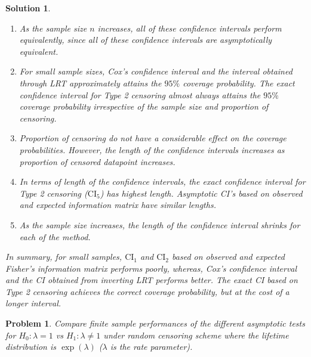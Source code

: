 \documentclass[12pt]{article}
\theoremstyle{problemstyle}
\newtheorem{pbm}{Problem}
\newtheorem*{solution*}{Solution}
\newenvironment{problem}{
\begin{tcolorbox}[colback=green!10!white,colframe=black!75!black, parbox = false]\begin{pbm} }{\end{pbm}\end{tcolorbox} }
\begin{document}
\begin{solution*}
\begin{enumerate}
    \item As the sample size $n$ increases, all of these confidence intervals perform equivalently, since all of these confidence intervals are asymptotically equivalent.
    \item For small sample sizes, Cox's confidence interval and the interval obtained through LRT approximately attains the $95\%$ coverage probability. The exact confidence interval for Type 2 censoring almost always attains the $95\%$ coverage probability irrespective of the sample size and proportion of censoring.
    \item Proportion of censoring do not have a considerable effect on the coverage probabilities. However, the length of the confidence intervals increases as proportion of censored datapoint increases.
    \item In terms of length of the confidence intervals, the exact confidence interval for Type 2 censoring ($\text{CI}_5$) has highest length. Asymptotic CI's based on observed and expected information matrix have similar lengths.
    \item As the sample size increases, the length of the confidence interval shrinks for each of the method. 
\end{enumerate}

In summary, for small samples, $\text{CI}_1$ and $\text{CI}_2$ based on observed and expected Fisher's information matrix performs poorly, whereas, Cox's confidence interval and the CI obtained from inverting LRT performs better. The exact CI based on Type 2 censoring achieves the correct coverage probability, but at the cost of a longer interval.

\end{solution*}


\pagebreak

\begin{problem}
    Compare finite sample performances of the different asymptotic tests for $H_0 : \lambda = 1$ vs $H_1 : \lambda \neq 1$ under random censoring scheme where the lifetime distribution is $\exp(\lambda)$ ($\lambda$ is the rate parameter).
\end{problem}
\end{document}
